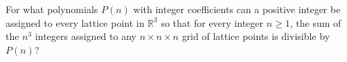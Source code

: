For what polynomials $P(n)$ with integer coefficients can a positive integer be assigned to every lattice point in $\mathbb{R}^3$ so that for every integer $n \ge 1$, the sum of the $n^3$ integers assigned to any $n \times n \times n$ grid of lattice points is divisible by $P(n)$?

